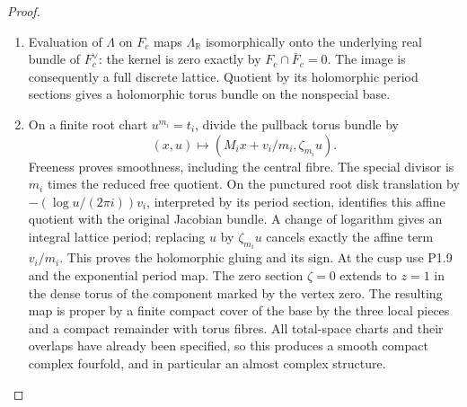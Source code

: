 \documentclass[11pt,a4paper]{article}
\theoremstyle{definition}
\begin{document}
\begin{proof}
\begin{enumerate}[label=\arabic*.]
\item Evaluation of $\Lambda$ on $F_c$ maps $\Lambda_{\mathbb R}$
isomorphically onto the underlying real bundle of $F_c^\vee$:
the kernel is zero exactly by $F_c\cap\bar F_c=0$.
The image is consequently a full discrete lattice.  Quotient by its
holomorphic period sections gives a holomorphic torus bundle on the
nonspecial base.

\item On a finite root chart $u^{m_i}=t_i$, divide the pullback torus bundle by
\[
(x,u)\longmapsto(M_ix+v_i/m_i,\zeta_{m_i}u).
\]
Freeness proves smoothness, including the central fibre.  The special
divisor is $m_i$ times the reduced free quotient.  On the punctured
root disk translation by
$-(\log u/(2\pi i))v_i$, interpreted by its period section, identifies
this affine quotient with the original Jacobian bundle.  A change of
logarithm gives an integral lattice period; replacing $u$ by
$\zeta_{m_i}u$ cancels exactly the affine term $v_i/m_i$.
This proves the holomorphic gluing and its sign.
At the cusp use P1.9 and the exponential period map.  The zero section
$\zeta=0$ extends to $z=1$ in the dense torus of the component marked
by the vertex zero.  The resulting map is proper by a finite compact
cover of the base by the three local pieces and a compact remainder
with torus fibres.  All total-space charts and their overlaps have
already been specified, so this produces a smooth compact complex
fourfold, and in particular an almost complex structure.


\end{enumerate}
\end{proof}
\end{document}
